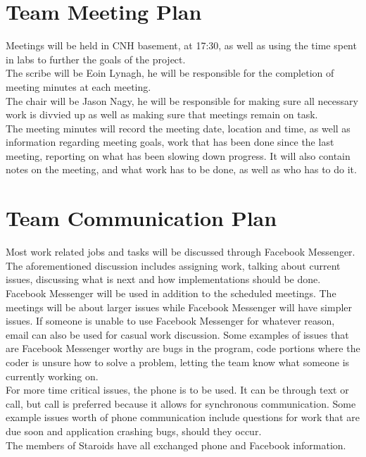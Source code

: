 \documentclass{article}
\begin{document}
\section{Team Meeting Plan}
Meetings will be held in CNH basement, at 17:30, as well as using the time spent in labs to further the goals of the project.\\
The scribe will be Eoin Lynagh, he will be responsible for the completion of meeting minutes at each meeting.\\
The chair will be Jason Nagy, he will be responsible for making sure all necessary work is divvied up as well as making sure that meetings remain on task.\\
The meeting minutes will record the meeting date, location and time, as well as information regarding meeting goals, work that has been done since the last meeting, reporting on what has been slowing down progress. It will also contain notes on the meeting, and what work has to be done, as well as who has to do it.\\

\section{Team Communication Plan}
Most work related jobs and tasks will be discussed through Facebook Messenger. The aforementioned discussion includes assigning work, talking about current issues, discussing what is next and how implementations should be done. Facebook Messenger will be used in addition to the scheduled meetings. The meetings will be about larger issues while Facebook Messenger will have simpler issues. If someone is unable to use Facebook Messenger for whatever reason, email can also be used for casual work discussion. Some examples of issues that are Facebook Messenger worthy are bugs in the program, code portions where the coder is unsure how to solve a problem, letting the team know what someone is currently working on.\\
For more time critical issues, the phone is to be used. It can be through text or call, but call is preferred because it allows for synchronous communication. Some example issues worth of phone communication include questions for work that are due soon and application crashing bugs, should they occur.\\
The members of Staroids have all exchanged phone and Facebook information.\\
\end{document}
